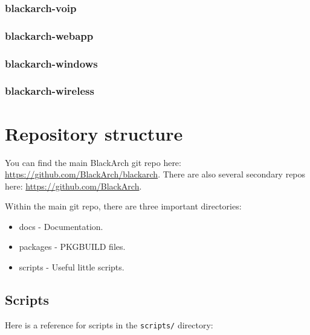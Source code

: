 \documentclass[a4paper, oneside, 11pt]{book}
\begin{document}
\subsubsection{blackarch-voip}



\subsubsection{blackarch-webapp}



\subsubsection{blackarch-windows}



\subsubsection{blackarch-wireless}




\section{Repository structure}

You can find the main BlackArch git repo here:
\href{https://github.com/BlackArch/blackarch}{https://github.com/BlackArch/blackarch}. There are
also several secondary repos here:
\href{https://github.com/BlackArch}{https://github.com/BlackArch}.

Within the main git repo, there are three important directories:

\begin{itemize}
	\item docs - Documentation.
	\item packages - PKGBUILD files.
	\item scripts - Useful little scripts.
\end{itemize}

\subsection{Scripts}

Here is a reference for scripts in the \verb|scripts/| directory:
\end{document}
